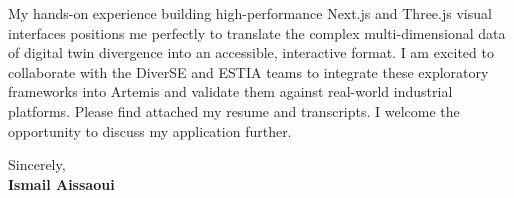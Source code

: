 \documentclass[11pt,a4paper]{article}
\begin{document}
\vspace{0.5em}
\noindent
My hands-on experience building high-performance Next.js and Three.js visual interfaces positions me perfectly to translate the complex multi-dimensional data of digital twin divergence into an accessible, interactive format. I am excited to collaborate with the DiverSE and ESTIA teams to integrate these exploratory frameworks into Artemis and validate them against real-world industrial platforms. Please find attached my resume and transcripts. I welcome the opportunity to discuss my application further.

\vspace{1.5em}
\noindent
Sincerely, \\[0.5em]
\textbf{Ismail Aissaoui}
\end{document}
